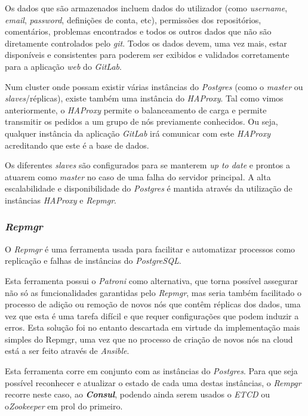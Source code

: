 \documentclass[12pt,a4paper]{article}
\begin{document}
Os dados que são armazenados incluem dados do utilizador (como \emph{username}, \emph{email}, \emph{password}, definições de conta, etc), permissões dos repositórios, comentários, problemas encontrados e todos os outros dados que não são diretamente controlados pelo \emph{git}. Todos os dados devem, uma vez mais, estar disponíveis e consistentes para poderem ser exibidos e validados corretamente para a aplicação \emph{web} do \emph{GitLab}.

Num cluster onde possam existir várias instâncias do \emph{Postgres} (como o \emph{master} ou \emph{slaves}/réplicas), existe também uma instância do \emph{HAProxy}. Tal como vimos anteriormente, o \emph{HAProxy} permite o balanceamento de carga e permite transmitir os pedidos a um grupo de nós previamente conhecidos. Ou seja, qualquer instância da aplicação \emph{GitLab} irá comunicar com este \emph{HAProxy} acreditando que este é a base de dados. 

Os diferentes \emph{slaves} são configurados para se manterem \emph{up to date} e prontos a atuarem como \emph{master} no caso de uma falha do servidor principal. A alta escalabilidade e disponibilidade do \emph{Postgres} é mantida através da utilização de instâncias \emph{HAProxy} e \emph{Repmgr}.

\subsubsection{\emph{Repmgr}}
O \emph{Repmgr} é uma ferramenta usada para facilitar e automatizar processos como replicação e falhas de instâncias do \emph{PostgreSQL}.

Esta ferramenta possui o \emph{Patroni} como alternativa, que torna possível assegurar não só as funcionalidades garantidas pelo \emph{Repmgr}, mas seria também facilitado o processo de adição ou remoção de novos nós que contêm réplicas dos dados, uma vez que esta é uma tarefa difícil e que requer configurações que podem induzir a erros. Esta solução foi no entanto descartada em virtude da implementação mais simples do Repmgr, uma vez que no processo de criação de novos nós na cloud está a ser feito através de \emph{Ansible}.

Esta ferramenta corre em conjunto com as instâncias do \emph{Postgres}. Para que seja possível reconhecer e atualizar o estado de cada uma destas instâncias, o \emph{Rempgr} recorre neste caso, ao \textbf{\emph{Consul}}, podendo ainda serem usados o \emph{ETCD} ou o\emph{Zookeeper} em prol do primeiro.
\end{document}
